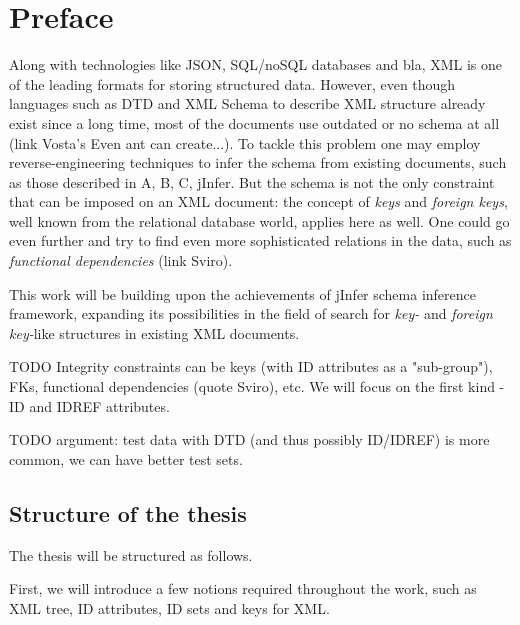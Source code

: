 \documentclass[a4paper,12pt,oneside]{report}
\let\openright=\clearpage
\def\chapwithtoc#1{
\chapter*{#1}
\addcontentsline{toc}{chapter}{#1}
}
\begin{document}
\newpage


\openright
\pagestyle{plain}
\setcounter{page}{1}
\tableofcontents

\newpage


\chapwithtoc{Preface}

Along with technologies like JSON, SQL/noSQL databases and bla, XML is one of the leading formats for storing structured data. However, even though languages such as DTD and XML Schema to describe XML structure already exist since a long time, most of the documents use outdated or no schema at all (link Vosta's Even ant can create...). To tackle this problem one may employ reverse-engineering techniques to infer the schema from existing documents, such as those described in A, B, C, jInfer. But the schema is not the only constraint that can be imposed on an XML document: the concept of \textit{keys} and \textit{foreign keys}, well known from the relational database world, applies here as well. One could go even further and try to find even more sophisticated relations in the data, such as \textit{functional dependencies} (link Sviro).

This work will be building upon the achievements of jInfer schema inference framework, expanding its possibilities in the field of search for \textit{key-} and \textit{foreign key-}like structures in existing XML documents.

TODO Integrity constraints can be keys (with ID attributes as a "sub-group"), FKs, functional dependencies (quote Sviro), etc.
We will focus on the first kind - ID and IDREF attributes.

TODO argument: test data with DTD (and thus possibly ID/IDREF) is more common, we can have better test sets.

\section{Structure of the thesis}

The thesis will be structured as follows. 

First, we will introduce a few notions required throughout the work, such as XML tree, ID attributes, ID sets and keys for XML. 
\end{document}
